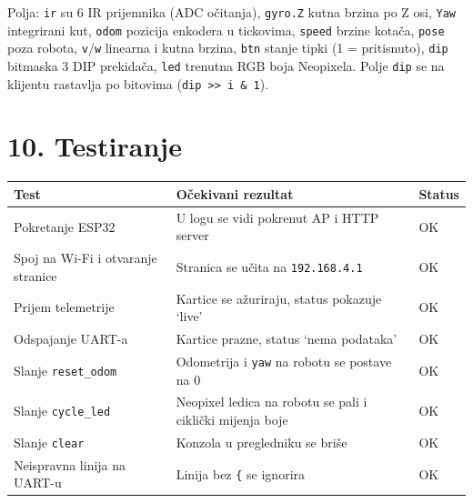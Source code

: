 \documentclass[10pt,a4paper]{article}
\begin{document}
Polja: \texttt{ir} su 6 IR prijemnika (ADC očitanja),
\texttt{gyro.Z} kutna brzina po Z osi,
\texttt{Yaw} integrirani kut,
\texttt{odom} pozicija enkodera u tickovima,
\texttt{speed} brzine kotača,
\texttt{pose} poza robota,
\texttt{v}/\texttt{w} linearna i kutna brzina,
\texttt{btn} stanje tipki (1 = pritisnuto),
\texttt{dip} bitmaska 3 DIP prekidača,
\texttt{led} trenutna RGB boja Neopixela.
Polje \texttt{dip} se na klijentu rastavlja po bitovima (\texttt{dip >> i \& 1}).

\section*{10. Testiranje}

\begin{table}[h!]
	\centering
	\begin{tabular}{@{}p{5cm}p{5cm}p{3cm}@{}}
		\toprule
		\textbf{Test}                      & \textbf{Očekivani rezultat}                               & \textbf{Status} \\
		\midrule
		Pokretanje ESP32                   & U logu se vidi pokrenut AP i HTTP server                  & OK              \\
		Spoj na Wi-Fi i otvaranje stranice & Stranica se učita na \texttt{192.168.4.1}                 & OK              \\
		Prijem telemetrije                 & Kartice se ažuriraju, status pokazuje `live'              & OK              \\
		Odspajanje UART-a                  & Kartice prazne, status `nema podataka'                    & OK              \\
		Slanje \texttt{reset\_odom}        & Odometrija i \texttt{yaw} na robotu se postave na 0       & OK              \\
		Slanje \texttt{cycle\_led}         & Neopixel ledica na robotu se pali i ciklički mijenja boje & OK              \\
		Slanje \texttt{clear}              & Konzola u pregledniku se briše                            & OK              \\
		Neispravna linija na UART-u        & Linija bez \texttt{\{} se ignorira                        & OK              \\
		\bottomrule
	\end{tabular}
\end{table}
\end{document}
